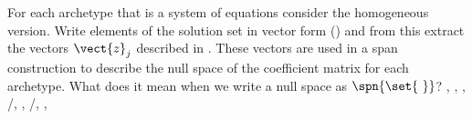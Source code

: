 For each archetype that is a system of equations consider the homogeneous version. Write elements of the solution set in vector form () and from this extract the vectors $\vect{z}_j$ described in .  These vectors are used in a span construction to describe the null space of the coefficient matrix for each archetype.  What does it mean when we write a null space as $\spn{\set{\ }}$?\newline\newline
{},
,
,
/,
,
/,
,

